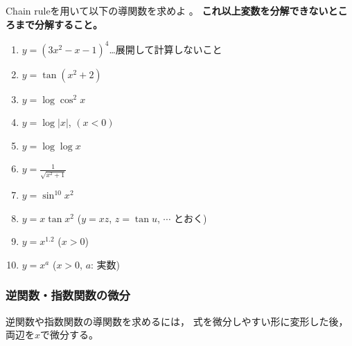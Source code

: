 \documentclass[twocolumn,11pt]{jarticle}
\begin{document}
\exercise
Chain ruleを用いて以下の導関数を求めよ
。
\textbf{これ以上変数を分解できないところまで分解すること。}

\begin{enumerate}
  \item \label{ditem:3x2-x-1}$y=(3x^2-x-1)^4$…展開して計算しないこと
  \item \label{ditem:tan(x2+2)}$y=\tan(x^2+2)$
  \item \label{ditem:logcos2x}$y=\log\cos^2x$
  \item \label{ditem:log|x|}$y=\log|x|$, $(x<0)$
  \item \label{ditem:loglogx}$y=\log\log x$
  \item \label{ditem:1/sqrt(x2+1)}$\displaystyle y=\frac{1}{\sqrt{x^2+1}}$
  \item \label{ditem:sin10x2}$y=\sin^{10}x^2$
  \item \label{ditem:xtan(x2)}$y=x\tan x^2$\quad
    ($y=xz$, $z=\tan u$, $\cdots$ とおく)
  \item \label{ditem:x^1.2}$y=x^{1.2}$ ($x>0$)
  \item \label{ditem:x^a}$y=x^a$ ($x>0$, $a$: 実数)
\end{enumerate}

\subsubsection{逆関数・指数関数の微分}
逆関数や指数関数の導関数を求めるには，
式を微分しやすい形に変形した後，両辺を$x$で微分する。
\end{document}
